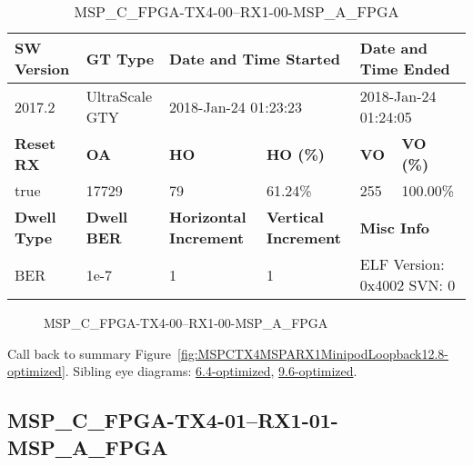 \begin{table}[h]
\centering
\caption{MSP\_C\_FPGA-TX4-00--RX1-00-MSP\_A\_FPGA}
\label{tab:MSPCFPGATX400RX100MSPAFPGA12.8-optimized}
\begin{tabular}{@{}|l|l|l|l|l|l|@{}}
\toprule
\textbf{SW Version}                & \textbf{GT Type}   & \multicolumn{2}{l|}{\textbf{Date and Time Started}}            & \multicolumn{2}{l|}{\textbf{Date and Time Ended}}        \\ \midrule
2017.2                       & UltraScale GTY          & \multicolumn{2}{l|}{2018-Jan-24 01:23:23}                   & \multicolumn{2}{l|}{2018-Jan-24 01:24:05}               \\ \midrule
\textbf{Reset RX}                  & \textbf{OA} & \textbf{HO}   & \textbf{HO (\%)} & \textbf{VO} & \textbf{VO (\%)} \\ \midrule
true & 17729        & 79          & 61.24\%        & 255        & 100.00\%       \\ \midrule
\textbf{Dwell Type}                & \textbf{Dwell BER} & \textbf{Horizontal Increment} & \textbf{Vertical Increment}    & \multicolumn{2}{l|}{\textbf{Misc Info}}                  \\ \midrule
BER                            & 1e-7        & 1        & 1           & \multicolumn{2}{l|}{ELF Version: 0x4002 SVN: 0}                         \\ \bottomrule
\end{tabular}
\end{table}

\begin{figure}[h]
\caption{MSP\_C\_FPGA-TX4-00--RX1-00-MSP\_A\_FPGA} \label{fig:MSPCFPGATX400RX100MSPAFPGA12.8-optimized}
\end{figure}

Call back to summary Figure~\ref{fig:MSPCTX4MSPARX1MinipodLoopback12.8-optimized}.
Sibling eye diagrams: \hyperref[sec:MSPCFPGATX400RX100MSPAFPGA6.4-optimized]{6.4-optimized}, \hyperref[sec:MSPCFPGATX400RX100MSPAFPGA9.6-optimized]{9.6-optimized}.

\clearpage
\newpage


\subsection{MSP\_C\_FPGA-TX4-01--RX1-01-MSP\_A\_FPGA}\label{sec:MSPCFPGATX401RX101MSPAFPGA12.8-optimized}


